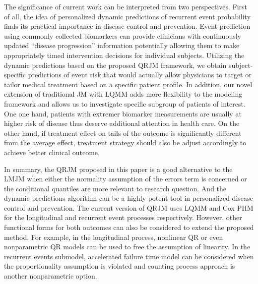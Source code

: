 The significance of current work can be interpreted from two perspectives. First of all, the idea of personalized dynamic predictions of recurrent event probability finds its practical importance in disease control and prevention. Event prediction using commonly collected biomarkers can provide clinicians with continuously updated ``disease progression'' information potentially allowing them to make appropriately timed intervention decisions for individual subjects. Utilizing the dynamic predictions based on the proposed QRJM framework, we obtain subject-specific predictions of event risk that would actually allow physicians to target or tailor medical treatment based on a specific patient profile. In addition, our novel extension of traditional JM with LQMM adds more flexibility to the modeling framework and allows us to investigate specific subgroup of patients of interest. One one hand, patients with extremer biomarker measurements are usually at higher risk of disease thus deserve additional attention in health care. On the other hand, if treatment effect on tails of the outcome is significantly different from the average effect, treatment strategy should also be adjust accordingly to achieve better clinical outcome.

In summary, the QRJM proposed in this paper is a good alternative to the LMJM when either the normality assumption of the errors term is concerned or the conditional quantiles are more relevant to research question. And the dynamic predictions algorithm can be a highly potent tool in personalized disease control and prevention. The current version of QRJM uses LQMM and Cox PHM for the longitudinal and recurrent event processes respectively. However, other functional forms for both outcomes can also be considered to extend the proposed method. For example, in the longitudinal process, nonlinear QR \citep{koenker1996interior} or even nonparametric QR \citep{le2005nonparametric} models can be used to free the assumption of linearity. In the recurrent events submodel, accelerated failure time model can be considered when the proportionality assumption is violated and counting process approach is another nonparametric option.


